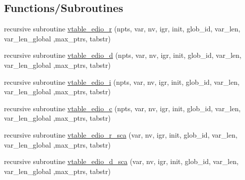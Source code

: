 \subsection*{Functions/\+Subroutines}
\begin{DoxyCompactItemize}
\item 
recursive subroutine \hyperlink{namespaceed__var__tables_a36d6819fcfd324eb837656868073559d}{vtable\+\_\+edio\+\_\+r} (npts, var, nv, igr, init, glob\+\_\+id, var\+\_\+len, var\+\_\+len\+\_\+global                                                                                                                                                   ,max\+\_\+ptrs, tabstr)
\item 
recursive subroutine \hyperlink{namespaceed__var__tables_a2d5460567ac0681fd8910275ab986334}{vtable\+\_\+edio\+\_\+d} (npts, var, nv, igr, init, glob\+\_\+id, var\+\_\+len, var\+\_\+len\+\_\+global                                                                                                                                                   ,max\+\_\+ptrs, tabstr)
\item 
recursive subroutine \hyperlink{namespaceed__var__tables_aee69080af76c9fa42c7ed981b68e5ce5}{vtable\+\_\+edio\+\_\+i} (npts, var, nv, igr, init, glob\+\_\+id, var\+\_\+len, var\+\_\+len\+\_\+global                                                                                                                                                   ,max\+\_\+ptrs, tabstr)
\item 
recursive subroutine \hyperlink{namespaceed__var__tables_aaac5e1ef08aa7ccf93e7916d12ce9c37}{vtable\+\_\+edio\+\_\+c} (npts, var, nv, igr, init, glob\+\_\+id, var\+\_\+len, var\+\_\+len\+\_\+global                                                                                                                                                   ,max\+\_\+ptrs, tabstr)
\item 
recursive subroutine \hyperlink{namespaceed__var__tables_a204fa52552675c94e71b2a23cb5d2d63}{vtable\+\_\+edio\+\_\+r\+\_\+sca} (var, nv, igr, init, glob\+\_\+id, var\+\_\+len, var\+\_\+len\+\_\+global                                                                                                                                                                       ,max\+\_\+ptrs, tabstr)
\item 
recursive subroutine \hyperlink{namespaceed__var__tables_a6d6f4602657a7fd22ab760b6be0ab061}{vtable\+\_\+edio\+\_\+d\+\_\+sca} (var, nv, igr, init, glob\+\_\+id, var\+\_\+len, var\+\_\+len\+\_\+global                                                                                                                                                                       ,max\+\_\+ptrs, tabstr)

\end{DoxyCompactItemize}
